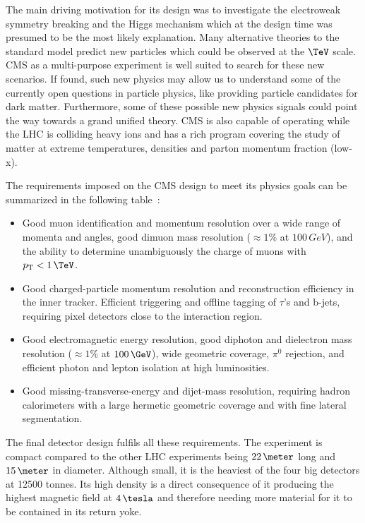 The main driving motivation for its design was to investigate the electroweak symmetry breaking and the Higgs mechanism which at the design time was presumed to be the most likely explanation. Many alternative theories to the standard model predict new particles which could be observed at the $\TeV$ scale. \gls{CMS} as a multi-purpose experiment is well suited to search for these new scenarios. If found, such new physics may allow us to understand some of the currently open questions in particle physics, like providing particle candidates for dark matter. Furthermore, some of these possible new physics signals could point the way towards a grand unified theory. \gls{CMS} is also capable of operating while the \gls{LHC} is colliding heavy ions and has a rich program covering the study of matter at extreme temperatures, densities and parton momentum fraction (low-x).

The requirements imposed on the \gls{CMS} design to meet its physics goals can be summarized in the following table~\cite{ARTICLE:CMSTechnicalProposal,ARTICLE:TheCMSExperiment}:

\begin{itemize}
  \item Good muon identification and momentum resolution over a wide range of momenta and angles, good dimuon mass resolution ($\approx 1\%$ at $100\,GeV$), and the ability to determine unambiguously the charge of muons with $\pt<1\,\TeV$.
  \item Good charged-particle momentum resolution and reconstruction efficiency in the inner tracker. Efficient triggering and offline tagging of $\tau$'s and b-jets, requiring pixel detectors close to the interaction region.
  \item Good electromagnetic energy resolution, good diphoton and dielectron mass resolution ($\approx 1\%$ at $100\,\GeV$), wide geometric coverage, $\pi^0$ rejection, and efficient photon and lepton isolation at high luminosities.
  \item Good missing-transverse-energy and dijet-mass resolution, requiring hadron calorimeters with a large hermetic geometric coverage and with fine lateral segmentation.
\end{itemize}

The final detector design fulfils all these requirements. The experiment is compact compared to the other \gls{LHC} experiments being $22\,\meter$ long and $15\,\meter$ in diameter. Although small, it is the heaviest of the four big detectors at 12500 tonnes. Its high density is a direct consequence of it producing the highest magnetic field at $4\,\tesla$ and therefore needing more material for it to be contained in its return yoke. 

